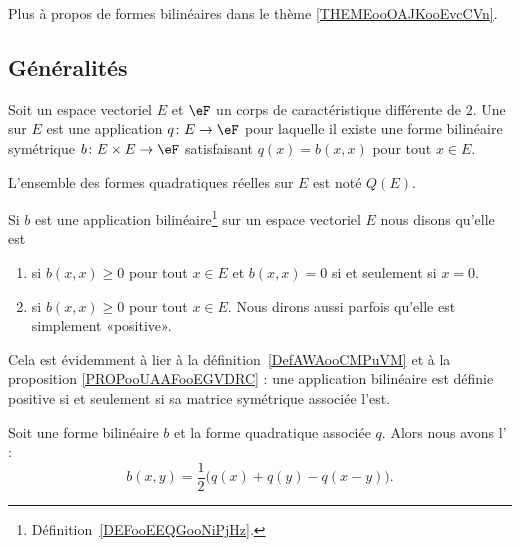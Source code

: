 Plus à propos de formes bilinéaires dans le thème \ref{THEMEooOAJKooEvcCVn}.

\subsection{Généralités}

\begin{definition}   \label{DefBSIoouvuKR}
    Soit un espace vectoriel \( E\) et \( \eF\) un corps de caractéristique différente de \( 2\). Une  sur \( E\) est une application \( q\colon E\to \eF\) pour laquelle il existe une forme bilinéaire symétrique \( b\colon E\times E\to \eF\) satisfaisant \( q(x)=b(x,x)\) pour tout \( x\in E\).

    L'ensemble des formes quadratiques réelles sur \( E\) est noté \( Q(E)\).
\end{definition}

\begin{definition}      \label{DEFooJIAQooZkBtTy}
    Si $b$ est une application bilinéaire\footnote{Définition~\ref{DEFooEEQGooNiPjHz}.} sur un espace vectoriel \( E\) nous disons qu'elle est
    \begin{enumerate}
        \item
             si $b(x,x)\geq 0$ pour tout $x\in E$ et $b(x,x)=0$ si et seulement si $x=0$.
        \item
             si $b(x,x)\geq 0$ pour tout $x\in E$. Nous dirons aussi parfois qu'elle est simplement «positive».
        \end{enumerate}
\end{definition}
Cela est évidemment à lier à la définition~\ref{DefAWAooCMPuVM} et à la proposition \ref{PROPooUAAFooEGVDRC} : une application bilinéaire est définie positive si et seulement si sa matrice symétrique associée l'est.

\begin{proposition} \label{PROPooZLXVooOsXCcB}
    Soit une forme bilinéaire \( b\) et la forme quadratique associée \( q\). Alors nous avons l' :
    \begin{equation}    \label{EqMrbsop}
        b(x,y)=\frac{ 1 }{2}\big( q(x)+q(y)-q(x-y) \big).
    \end{equation}
\end{proposition}


